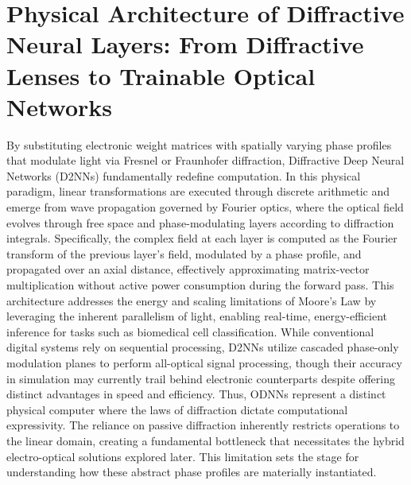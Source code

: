 \section{Physical Architecture of Diffractive Neural Layers: From Diffractive Lenses to Trainable Optical Networks}\label{physical-architecture-of-diffractive-neural-layers-from-diffractive-lenses-to-trainable-optical-networks}

By substituting electronic weight matrices with spatially varying phase profiles that modulate light via Fresnel or Fraunhofer diffraction, Diffractive Deep Neural Networks (D2NNs) fundamentally redefine computation. \citep{doi_10_1126_science_aat8084_e055772d} \citep{doi_10_1117_12_2675468_10b5d458} In this physical paradigm, linear transformations are executed through discrete arithmetic and emerge from wave propagation governed by Fourier optics, where the optical field evolves through free space and phase-modulating layers according to diffraction integrals. Specifically, the complex field at each layer is computed as the Fourier transform of the previous layer's field, modulated by a phase profile, and propagated over an axial distance, effectively approximating matrix-vector multiplication without active power consumption during the forward pass. \citep{doi_10_1117_1_apn_5_1_016005_dfabad74} This architecture addresses the energy and scaling limitations of Moore's Law by leveraging the inherent parallelism of light, enabling real-time, energy-efficient inference for tasks such as biomedical cell classification. While conventional digital systems rely on sequential processing, D2NNs utilize cascaded phase-only modulation planes to perform all-optical signal processing, though their accuracy in simulation may currently trail behind electronic counterparts despite offering distinct advantages in speed and efficiency. Thus, ODNNs represent a distinct physical computer where the laws of diffraction dictate computational expressivity. The reliance on passive diffraction inherently restricts operations to the linear domain, creating a fundamental bottleneck that necessitates the hybrid electro-optical solutions explored later. This limitation sets the stage for understanding how these abstract phase profiles are materially instantiated. \citep{doi_10_1364_ol_593231_ab93febc} \citep{s2_f7b7631268f17b1f868015df0bd08ef57904024d_011f3a59} \citep{doi_10_1063_5_0323145_de1041b1} \citep{doi_10_1109_twc_2025_3632886_01858e99} \citep{doi_10_3390_life13051148_9434b5b6} \citep{doi_10_1364_ol_428761_f1f67ac8} \citep{doi_10_1002_lpor_202200348_d54cae18}

